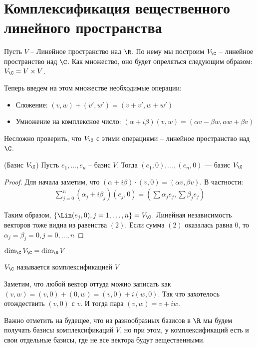 \section{Комплексификация вещественного линейного пространства}
Пусть $V$ -- Линейное пространство над $\R$. По нему мы построим $V_{\C}$ -- линейное пространство над $\C$.
Как множество, оно будет опреляться следующим образом: $V_{\C} = V \times V$. 

Теперь введем на этом множестве необходимые операции: 
\begin{itemize}
    \item Сложение: $(v, w) + (v', w') = (v + v', w + w')$
    \item Умножение на комплексное число: $(\alpha + i \beta)(v, w) = (\alpha v - \beta w, \alpha w + \beta v)$ 
\end{itemize}
Несложно проверить, что $V_{\C}$ с этими операциями -- линейное пространство над $\C$.

\begin{theorem-non}(Базис $V_{\C}$)
    Пусть $e_1, \dots, e_n$ -- базис $V$. Тогда $(e_1, 0), \dots, (e_n, 0)$ --- базис $V_{\C}$
\end{theorem-non}
\begin{proof} \quad 

    Для начала заметим, что $(\alpha + i \beta) \cdot (v, 0) = (\alpha v, \beta v)$. В частности: 
    \begin{gather}
        \sum\limits_{j=0}^{n} (\alpha_j + i \beta_j)(e_j, 0) = \left( \sum \alpha_j e_j, \sum \beta_j e_j \right)
    \end{gather}
    
    Таким образом, $\{ \Lin(e_j, 0), j = 1, \dots, n \} = V_{\C}$. Линейная независимость векторов тоже видна из равенства $(2)$. 
    Если сумма $(2)$ оказалась равна 0, то $\alpha_j = \beta_j = 0, j = 0, \dots, n$
\end{proof}

\follow $\dim_\C V_{\C} = \dim_\R V$

\begin{conj}
    $V_{\C}$ называется комплексификацией $V$
\end{conj}

Заметим, что любой вектор оттуда можно записать как $(v, w) = (v, 0) + (0, w) = (v, 0) + i(w, 0)$.
Так что захотелось отождествить $(v, 0)$ с $v$. И тогда пара $(v, w) = v + iw$.

Важно отметить на будещее, что из разнообразных базисов в $\R$ мы будем получать базисы комплексификаций $V$, 
но при этом, у комплексификаций есть и свои отдельные базисы, где не все вектора будут вещественными. 